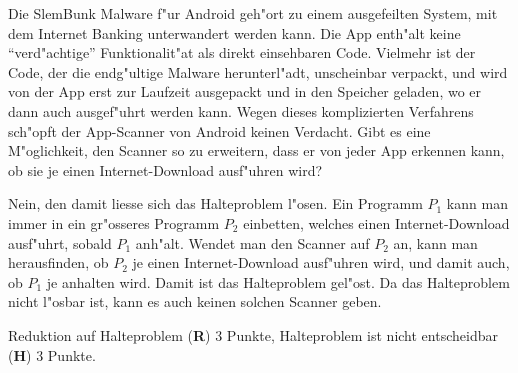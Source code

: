 Die SlemBunk Malware f"ur Android geh"ort zu einem ausgefeilten
System, mit dem Internet Banking unterwandert werden kann.
Die App enth"alt keine ``verd"achtige'' Funktionalit"at als direkt
einsehbaren Code. 
Vielmehr ist der Code, der die endg"ultige Malware herunterl"adt,
unscheinbar verpackt, und wird von der App erst zur Laufzeit
ausgepackt und in den Speicher geladen, wo er dann auch ausgef"uhrt
werden kann.
Wegen dieses komplizierten Verfahrens sch"opft der App-Scanner von
Android keinen Verdacht.
Gibt es eine M"oglichkeit, den Scanner so zu erweitern, dass er 
von jeder App erkennen kann, ob sie je einen Internet-Download
ausf"uhren wird?

\begin{loesung}
Nein, den damit liesse sich das Halteproblem l"osen.
Ein Programm $P_1$ kann man immer in ein gr"osseres Programm $P_2$
einbetten, welches einen Internet-Download ausf"uhrt, sobald $P_1$
anh"alt.
Wendet man den Scanner auf $P_2$ an,
kann man herausfinden, ob $P_2$
je einen Internet-Download ausf"uhren wird, und damit auch, ob
$P_1$ je anhalten wird.
Damit ist das Halteproblem gel"ost.
Da das Halteproblem nicht l"osbar ist, kann es auch keinen solchen
Scanner geben.
\end{loesung}

\begin{bewertung}
Reduktion auf Halteproblem ({\bf R}) 3 Punkte,
Halteproblem ist nicht entscheidbar ({\bf H}) 3 Punkte.
\end{bewertung}



